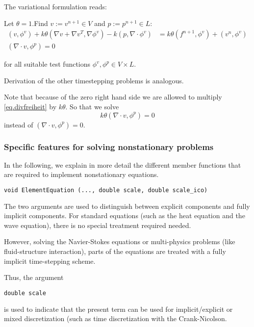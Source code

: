 The variational formulation reads:

\begin{Problem}
Let $\theta =1$.Find $v:= v^{n+1}\in V$ and $p:= p^{n+1}\in L$:
\begin{align}
(v,\phi^v) + k\theta (\nabla v + \nabla v^{T}, \nabla\phi^v) 
- k  (p, \nabla\cdot\phi^v) &=
k\theta (f^{n+1},\phi^v) +  (v^n,\phi^v)\\
(\nabla \cdot v,\phi^p) = 0  \label{eq.divfreiheit}
\end{align}
\end{Problem}
for all suitable test functions ${\phi^v , \phi^p} \in V\times L$. 


Derivation of the other timestepping problems is analogous.
\begin{remark}
Note that because of the zero right hand side we are allowed to multiply \eqref{eq.divfreiheit} by $k\theta$. So that we solve $$k\theta(\nabla \cdot v,\phi^p) = 0$$ instead of $(\nabla \cdot v,\phi^p) = 0$. 
\end{remark}


\subsubsection{Specific features for 
solving nonstationary problems}

In the following, we explain in more detail the 
different member functions that are required to
implement nonstationary equations.

\begin{verbatim}
void ElementEquation (..., double scale, double scale_ico)
\end{verbatim}
The two arguments 
are used to distinguish between explicit 
components and fully implicit components. 
For standard equations (such as the heat 
equation and the wave equation), there is 
no special treatment required needed. 

However, solving the Navier-Stokes equations or 
multi-physics problems (like fluid-structure
interaction), parts of the equations are treated
with a fully implicit time-stepping scheme.

Thus, the argument
\begin{verbatim}
double scale
\end{verbatim}
is used to indicate that the present term 
can be used for implicit/explicit or mixed 
discretization (such as time discretization with
the Crank-Nicolson.

